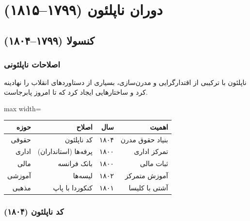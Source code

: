 \newpage
{}%
\section{دوران ناپلئون (۱۷۹۹–۱۸۱۵)}
\label{sec:napoleon}

\subsection{کنسولا (۱۷۹۹–۱۸۰۴)}
\label{sec:consulate}

\subsubsection{اصلاحات ناپلئونی}

ناپلئون با ترکیبی از اقتدارگرایی و مدرن‌سازی، بسیاری از دستاوردهای
انقلاب را نهادینه کرد و ساختارهایی ایجاد کرد که تا امروز پابرجاست.

\begin{center}
\begin{adjustbox}{max width=\linewidth}%
\begin{tabular}{rrrr}
\toprule
\rowcolor{PhaseNapoleon}
\color{white}\bfseries حوزه & \color{white}\bfseries اصلاح
  & \color{white}\bfseries سال & \color{white}\bfseries اهمیت \\
\midrule
\rowcolor{BgWarm} حقوقی & کد ناپلئون & ۱۸۰۴ & بنیاد حقوق مدرن \\
\rowcolor{BgCool} اداری & پرفه‌ها (استانداران) & ۱۸۰۰ & تمرکز اداری \\
\rowcolor{BgWarm} مالی & بانک فرانسه & ۱۸۰۰ & ثبات مالی \\
\rowcolor{BgCool} آموزشی & لیسه‌ها & ۱۸۰۲ & آموزش متمرکز \\
\rowcolor{BgWarm} مذهبی & کنکوردا با پاپ & ۱۸۰۱ & آشتی با کلیسا \\
\bottomrule
\end{tabular}
\end{adjustbox}
\end{center}

\subsubsection{کد ناپلئون (۱۸۰۴)}

